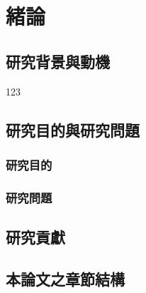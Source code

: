 \chapter{緒論}
\label{cha:intro}

\section{研究背景與動機}
123 \cite{dormans2010adventures}


\section{研究目的與研究問題}

\subsection{研究目的}

\subsection{研究問題}

\section{研究貢獻}

\section{本論文之章節結構}
